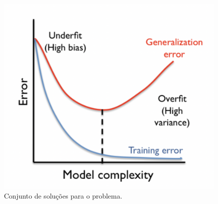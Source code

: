 \begin{figure}[H]
    \center
    \includegraphics[width=\linewidth]{images/regularizacao.png}
    \caption{\label{figura1}Conjunto de soluções para o problema.}
  \end{figure}


